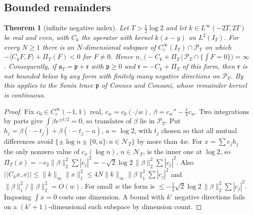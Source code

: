 \documentclass[11pt]{amsart}
\newtheorem{theorem}{Theorem}[section]
\theoremstyle{definition}
\theoremstyle{remark}
\newcommand{\PT}{\mathcal P_T}
\newcommand{\IT}{I_T}
\newcommand{\NT}{\mathcal N_T}
\newcommand{\PiT}{\Pi_T}
\begin{document}
\subsection{Bounded remainders}
\begin{theorem}[infinite negative index]\label{thm:inertia-nogo}
Let $T>\frac12\log2$ and let $k\in L^\infty(-2T,2T)$ be real and even, with $C_k$ the operator with kernel
$k(x-y)$ on $L^2(\IT)$. For every $N\ge1$ there is an $N$-dimensional subspace of
$C_c^\infty(\IT)\cap\PT$ on which $-\langle C_kF,F\rangle+\PiT(F)<0$ for $F\ne0$. Hence
$n_-\big(-C_k+\PiT\,\big|\,\PT\cap\{\int F=0\}\big)=\infty$. Consequently, if $\mathfrak a_T=\mathfrak p+\mathfrak r$ with
$\mathfrak p\ge0$ and $\mathfrak r=-C_k+\PiT$ of this form, then $\mathfrak r$ is not bounded below by any form
with finitely many negative directions on $\PT$. By \cite[Thm.~4.7]{ConnesConsani2021} this applies to the
Sonin trace $\mathfrak p$ of Connes and Consani, whose remainder kernel is continuous.
\end{theorem}
\begin{proof}
Fix $c_0\in C_c^\infty(-1,1)$ real, $c_w=c_0(\cdot/w)$, $\beta=c_w''-\frac14c_w$. Two
integrations by parts give $\int\beta e^{\pm t/2}=0$, so translates of $\beta$ lie in $\PT$. Put
$h_j=\beta(\cdot-t_j)+\beta(\cdot-t_j-a)$, $a=\log2$, with $t_j$ chosen so that all mutual differences avoid
$\{\pm\log n\pm\{0,a\}:n\in\NT\}$ by more than $4w$. For $x=\sum c_jh_j$ the only nonzero value of $c_x(\log n)$,
$n\in\NT$, is the inner one at $\log2$, so $\PiT(x)=-v_2\|\beta\|_2^2\sum|c_j|^2=-\sqrt2\log2\,\|\beta\|_2^2\sum|c_j|^2$.
Also $|\langle C_kx,x\rangle|\le\|k\|_\infty\|x\|_1^2\le4N\|k\|_\infty\|\beta\|_1^2\sum|c_j|^2$ and
$\|\beta\|_1^2/\|\beta\|_2^2=O(w)$. For small $w$ the form is $\le-\frac12\sqrt2\log2\,\|\beta\|_2^2\sum|c_j|^2$.
Imposing $\int x=0$ costs one dimension. A bound with $k'$ negative directions fails on a $(k'+1)$-dimensional
such subspace by dimension count.
\end{proof}
\end{document}
